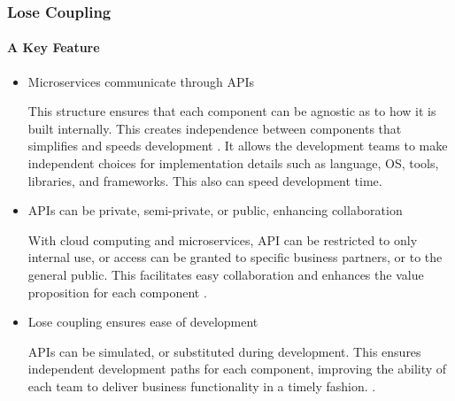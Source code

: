 \begin{frame}
  \frametitle{Lose Coupling}
  \framesubtitle{A Key Feature}
  \begin{itemize}
    \item<1-> Microservices communicate through APIs

           {\scriptsize{This structure ensures that each component can be agnostic as to how it is built internally. This creates independence between components that simplifies and speeds development \parencite{WhatAPI}. It allows the development teams to make independent choices for implementation details such as language, OS, tools, libraries, and frameworks. This also can speed development time.}}

    \item<2-> APIs can be private, semi-private, or public, enhancing collaboration

           {\scriptsize{With cloud computing and microservices, API can be restricted to only internal use, or access can be granted to specific business partners, or to the general public. This facilitates easy collaboration and enhances the value proposition for each component \parencite{WhatAPI,dasilvaMicroservicebasedMiddlewareCollaborative2020}.  }}

    \item<3-> Lose coupling ensures ease of development

           {\scriptsize{APIs can be simulated, or substituted during development. This ensures independent development paths for each component, improving the ability of each team to deliver business functionality in a timely fashion.  \parencite{zimmermannMicroservicesTenets2017}.}}

  \end{itemize}
\end{frame}
